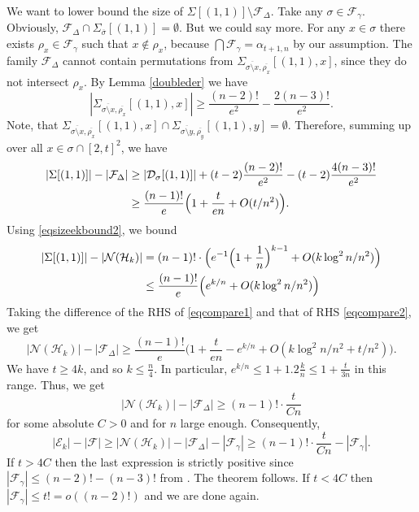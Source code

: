 \documentclass[11pt]{extarticle}
\numberwithin{equation}{section} %
\theoremstyle{plain}
\theoremstyle{definition}
\newcommand{\FF}{\mathcal{F}}
\newcommand{\ff}{\mathcal{F}}
\newcommand{\m}{\mathcal}
\newcommand{\HH}{\mathcal{H}}
\begin{document}
We want to lower bound the size of $\Sigma[(1, 1)]\setminus \ff_{\Delta}$. Take any $\sigma \in \FF_\gamma$. Obviously, $\ff_{\Delta}\cap \Sigma_{\overline{\sigma}}[(1,1)]=\emptyset.$ But we could say more. 
For any $x  \in \sigma$ there exists $\rho_x \in \FF_\gamma$ such that $x \notin \rho_x$, because $\bigcap \FF_\gamma = \alpha_{t+1, n}$ by our assumption. The family $\ff_\Delta$ cannot contain permutations from $\Sigma_{\overline{\sigma \setminus x}, \overline{\rho_x}}[(1, 1), x]$, since they do not intersect $\rho_x$. %
By Lemma \ref{doubleder} we have $$|\Sigma_{\overline{\sigma\setminus x}, \overline{\rho_x}}[(1, 1), x]| \geq \frac{(n-2)!}{e^2} - \frac{2(n-3)!}{e^2}.$$
Note, that $\Sigma_{\overline{\sigma\setminus x}, \overline{\rho_x}}[(1, 1), x] \cap \Sigma_{\overline{\sigma\setminus y}, \overline{\rho_y}}[(1, 1), y] = \emptyset$. Therefore, summing up over all $x \in \sigma \cap [2, t]^2$, we have
\begin{align}
\notag |\Sigma[(1,1)]|-|\ff_\Delta| &\geq  |\m D_{\sigma}[(1,1)]| +(t-2)\frac{(n-2)!}{e^2} - (t-2)\frac{4(n-3)!}{e^2}\\
\label{eqcompare1}&\geq \frac {(n-1)!}e \Big(1+ \frac {t}{en}+O(t/ n^{2})\Big). 
\end{align}
Using \eqref{eqsizeekbound2}, we bound 
\begin{align}
\notag|\Sigma[(1,1)]|-|\m N(\m H_k)|&= (n-1)!\cdot \Big(e^{-1}\Big(1+\frac 1n\Big)^{k-1}+O(k\log^2 n/n^2)\Big) \\
\label{eqcompare2}&\le \frac{(n-1)!}e\Big(e^{k/n}+O(k\log^2 n/n^2)\Big)
\end{align}
Taking the difference of the RHS of \eqref{eqcompare1} and that of RHS \eqref{eqcompare2}, we get $$|\m N(\m H_k)|-|\m F_\Delta|\ge \frac{(n-1)!}e \Big(1+\frac t{en}-e^{k/n}+O(k\log^2 n/n^2+t/n^2)\Big).$$
We have $t \geq 4k$, and so $k \leq \frac{n}{4}$. In particular, $e^{k/n}\le 1+1.2 \frac kn\le 1+\frac t{3n}$ in this range. Thus, we get $$|\m N(\m H_k)|-|\m F_\Delta|\ge (n-1)!\cdot  \frac t{C n}$$
for some absolute $C>0$ and for $n$ large enough.
Consequently, 
$$
|\m{E}_k|-|\FF| \ge |\m{N}(\HH_k)|  - |\FF_\Delta|- |\FF_\gamma| \ge (n-1)!\cdot  \frac t{C n} - |\FF_\gamma|.
$$
If $t>4C$ then the last expression is strictly positive since  $|\FF_\gamma| \leq (n-2)!-(n-3)!$ from \cite{WX}. The theorem follows. If $t<4C$ then $|\ff_\gamma|\le t! = o((n-2)!)$ and we are done again. 

    
\end{document}
